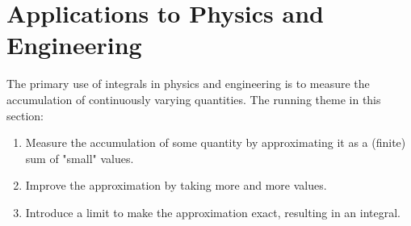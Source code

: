 \documentclass[10pt,]{book}
\numberwithin{equation}{section}
\begin{document}
\section[{Applications to Physics and Engineering}]{Applications to Physics and Engineering}\label{section-applications-to-physics-and-engineering}
\begin{introduction}{}%
\hypertarget{p-676}{}%
The primary use of integrals in physics and engineering is to measure the accumulation of continuously varying quantities. The running theme in this section:%
\leavevmode%
\begin{enumerate}
\item\hypertarget{li-52}{}\hypertarget{p-677}{}%
Measure the accumulation of some quantity by approximating it as a (finite) sum of "small" values.%
\item\hypertarget{li-53}{}\hypertarget{p-678}{}%
Improve the approximation by taking more and more values.%
\item\hypertarget{li-54}{}\hypertarget{p-679}{}%
Introduce a limit to make the approximation exact, resulting in an integral.%
\end{enumerate}
\end{introduction}%
%
%
\typeout{************************************************}
\typeout{************************************************}
%
\end{document}
